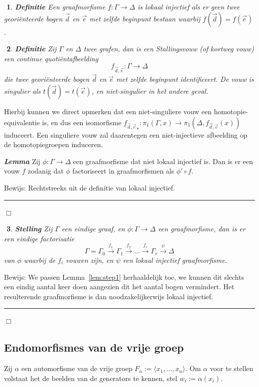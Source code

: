 \documentclass[12pt]{book}
\newcommand{\bew}{{\sc Bewijs: }}
\newcommand{\B}{\rule{1mm}{0mm} \hfill $\Box$ }
\newtheorem{stelh}{$\!\!$}[section]
\newenvironment{stel}{\begin{stelh}{\em {\bf Stelling }}}{\end{stelh}}
\newenvironment{lem}{\begin{lemh}{\em {\bf Lemma }}}{\end{lemh}}
\newtheorem{dfh}[stelh]{$\!\!$}
\newenvironment{df}{\begin{dfh} \em {\bf Definitie }}{\end{dfh}}
\begin{document}
\begin{df}
Een graafmorfisme $f:\Gamma \to \Delta$ is \emph{lokaal injectief} als er geen twee geori\"enteerde bogen $\vec{d}$ en $\vec{e}$ met zelfde beginpunt bestaan waarbij $f(\vec{d}) = f(\vec{e})$.
\end{df}

\begin{df}
Zij $\Gamma$ en $\Delta$ twee grafen, dan is een \emph{Stallingsvouw} (of kortweg \emph{vouw}) een continue quoti\"entafbeelding $$f_{\vec{d}, \vec{e}} \colon \Gamma \to \Delta$$
die twee geori\"enteerde bogen $\vec{d}$ en $\vec{e}$ met zelfde beginpunt identificeert. De vouw is \emph{singulier} als $t(\vec{d}) = t(\vec{e})$, en \emph{niet-singulier} in het andere geval.
\end{df}

Hierbij kunnen we direct opmerken dat een niet-singuliere vouw een homotopie-equivalentie is, en dus een isomorfisme ${f_{\vec{d}, \vec{e}}}_* \colon \pi_1(\Gamma, x) \to \pi_1(\Delta, f_{\vec{d}, \vec{e}}(x))$ induceert. Een singuliere vouw zal daarentegen een niet-injectieve afbeelding op de homotopiegroepen induceren.


\begin{lem}\label{lem:step1}
Zij $\phi\colon \Gamma \to \Delta$ een graafmorfisme dat niet lokaal injectief is. Dan is er een vouw $f$ zodanig dat $\phi$ factoriseert in graafmorfismen als $\phi' \circ f$.
\end{lem}
\bew
Rechtstreeks uit de definitie van lokaal injectief. \B

\begin{stel}\label{stel:fact}
Zij $\Gamma$ een eindige graaf, en $\phi: \Gamma \to \Delta$ een graafmorfisme, dan is er een eindige factorisatie 
$$\Gamma = \Gamma_0  \overset{f_1}{\to} \Gamma_1 \overset{f_2}{\to} \dots \overset{f_r}{\to}  \Gamma_r \overset{\psi}{\to} \Delta $$ van $\phi$ waarbij de $f_i$ vouwen zijn, en $\psi$ een lokaal injectief graafmorfisme.
\end{stel}
\bew
We passen Lemma~\ref{lem:step1} herhaaldelijk toe, we kunnen dit slechts een eindig aantal keer doen aangezien dit het aantal bogen vermindert. Het resulterende graafmorfisme is dan noodzakelijkerwijs lokaal injectief.
\B

\subsection{Endomorfismes van de vrije groep}

Zij $\alpha$ een automorfisme van de vrije groep $F_n := \langle x_1, \dots , x_n \rangle$. Om $\alpha$ voor te stellen volstaat het de beelden van de generators te kennen, stel $w_i := \alpha(x_i)$.
\end{document}
